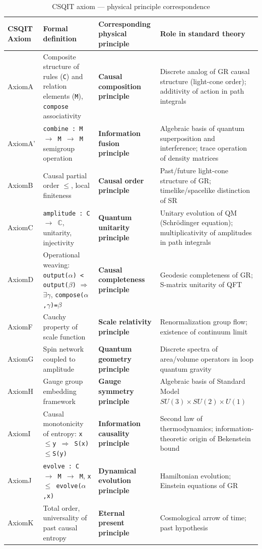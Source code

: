 \documentclass[aps,prd,twocolumn,nofootinbib,floatfix]{revtex4-2}
\begin{document}
\begin{table}[!t]
\centering
\scriptsize
\begin{tabular}{|p{1.5cm}|p{3.5cm}|p{3.5cm}|p{4cm}|}
\hline
\textbf{CSQIT Axiom} & \textbf{Formal definition} & \textbf{Corresponding physical principle} & \textbf{Role in standard theory} \\
\hline
AxiomA & Composite structure of rules (\texttt{C}) and relation elements (\texttt{M}), \texttt{compose} associativity & \textbf{Causal composition principle} & Discrete analog of GR causal structure (light-cone order); additivity of action in path integrals \\
\hline
AxiomA' & \texttt{combine : M $\to$ M $\to$ M} semigroup operation & \textbf{Information fusion principle} & Algebraic basis of quantum superposition and interference; trace operation of density matrices \\
\hline
AxiomB & Causal partial order \texttt{$\leq$}, local finiteness & \textbf{Causal order principle} & Past/future light-cone structure of GR; timelike/spacelike distinction of SR \\
\hline
AxiomC & \texttt{amplitude : C $\to$ $\mathbb{C}$}, unitarity, injectivity & \textbf{Quantum unitarity principle} & Unitary evolution of QM (Schr\"odinger equation); multiplicativity of amplitudes in path integrals \\
\hline
AxiomD & Operational weaving: \texttt{output($\alpha$) < output($\beta$)} $\Rightarrow$ $\exists\gamma$, \texttt{compose($\alpha$,$\gamma$)=$\beta$} & \textbf{Causal completeness principle} & Geodesic completeness of GR; S-matrix unitarity of QFT \\
\hline
AxiomF & Cauchy property of scale function & \textbf{Scale relativity principle} & Renormalization group flow; existence of continuum limit \\
\hline
AxiomG & Spin network coupled to amplitude & \textbf{Quantum geometry principle} & Discrete spectra of area/volume operators in loop quantum gravity \\
\hline
AxiomH & Gauge group embedding framework & \textbf{Gauge symmetry principle} & Algebraic basis of Standard Model $SU(3)\times SU(2)\times U(1)$ \\
\hline
AxiomI & Causal monotonicity of entropy: \texttt{x$\leq$y $\Rightarrow$ S(x)$\leq$S(y)} & \textbf{Information causality principle} & Second law of thermodynamics; information-theoretic origin of Bekenstein bound \\
\hline
AxiomJ & \texttt{evolve : C $\to$ M $\to$ M}, \texttt{x $\leq$ evolve($\alpha$,x)} & \textbf{Dynamical evolution principle} & Hamiltonian evolution; Einstein equations of GR \\
\hline
AxiomK & Total order, universality of past causal entropy & \textbf{Eternal present principle} & Cosmological arrow of time; past hypothesis \\
\hline
\end{tabular}
\caption{CSQIT axiom --- physical principle correspondence}
\end{table}
\end{document}
